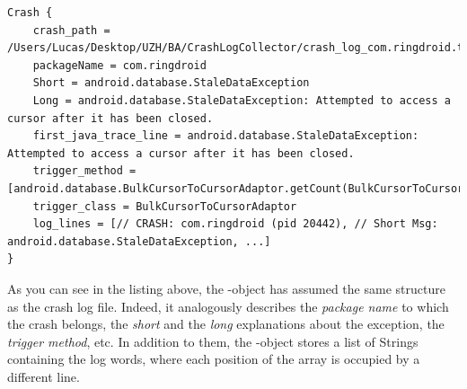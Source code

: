 \begin{lstlisting}[caption=\Crash-object,basicstyle=\fontsize{6}{8}\ttfamily, label={lst: crashobject}]
Crash {
	crash_path = /Users/Lucas/Desktop/UZH/BA/CrashLogCollector/crash_log_com.ringdroid.txt
	packageName = com.ringdroid
	Short = android.database.StaleDataException
	Long = android.database.StaleDataException: Attempted to access a cursor after it has been closed.
	first_java_trace_line = android.database.StaleDataException: Attempted to access a cursor after it has been closed.
	trigger_method = [android.database.BulkCursorToCursorAdaptor.getCount(BulkCursorToCursorAdaptor.java:70)]
	trigger_class = BulkCursorToCursorAdaptor
	log_lines = [// CRASH: com.ringdroid (pid 20442), // Short Msg: android.database.StaleDataException, ...]
}
\end{lstlisting}
As you can see in the listing above, the \Crash-object has assumed the same structure as the crash log file. Indeed, it analogously describes the \textit{package name} to which the crash belongs, the \textit{short} and the \textit{long} explanations about the exception, the \textit{trigger method}, etc.
In addition to them, the \Crash-object stores a list of Strings containing the log words, where each position of the array is occupied by a different line. 
